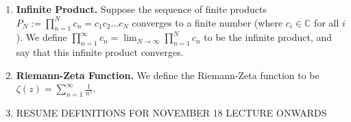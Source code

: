\documentclass[11pt]{article}
\theoremstyle{definition}
\theoremstyle{named}
\begin{document}
\begin{enumerate}
    \item \textbf{Infinite Product. } Suppose the sequence of finite products $P_N := \prod_{n=1}^{N} c_n = c_1 c_2 \dots c_N$ converges to a finite number (where $c_i \in \mathbb{C}$ for all $i$). We define $\prod_{n=1}^{\infty} c_n = \lim_{N \to \infty} \prod_{n=1}^{N} c_n$ to be the infinite product, and say that this infinite product converges. 
    \item \textbf{Riemann-Zeta Function. } We define the Riemann-Zeta function to be $\zeta(z) = \sum_{n=1}^{\infty} \frac{1}{n^z}$. 
    \item RESUME DEFINITIONS FOR NOVEMBER 18 LECTURE ONWARDS
\end{enumerate}
\end{document}
